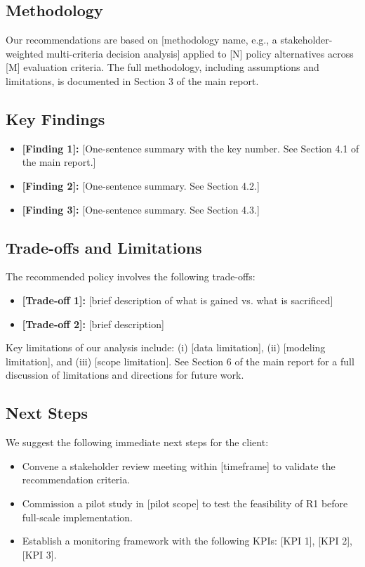 \documentclass[12pt, a4paper]{article}
\begin{document}
\subsection*{Methodology}
Our recommendations are based on [methodology name, e.g., a
stakeholder-weighted multi-criteria decision analysis] applied to
[N] policy alternatives across [M] evaluation criteria. The full
methodology, including assumptions and limitations, is documented
in Section 3 of the main report.

\subsection*{Key Findings}
\begin{itemize}[leftmargin=2em]
    \item \textbf{[Finding 1]:} [One-sentence summary with the key
    number. See Section 4.1 of the main report.]
    \item \textbf{[Finding 2]:} [One-sentence summary. See Section 4.2.]
    \item \textbf{[Finding 3]:} [One-sentence summary. See Section 4.3.]
\end{itemize}

\subsection*{Trade-offs and Limitations}
The recommended policy involves the following trade-offs:
\begin{itemize}[leftmargin=2em]
    \item \textbf{[Trade-off 1]:} [brief description of what is
    gained vs. what is sacrificed]
    \item \textbf{[Trade-off 2]:} [brief description]
\end{itemize}

Key limitations of our analysis include: (i) [data limitation],
(ii) [modeling limitation], and (iii) [scope limitation]. See
Section 6 of the main report for a full discussion of limitations
and directions for future work.

\subsection*{Next Steps}
We suggest the following immediate next steps for the client:
\begin{itemize}[leftmargin=2em]
    \item Convene a stakeholder review meeting within [timeframe]
    to validate the recommendation criteria.
    \item Commission a pilot study in [pilot scope] to test the
    feasibility of R1 before full-scale implementation.
    \item Establish a monitoring framework with the following KPIs:
    [KPI 1], [KPI 2], [KPI 3].
\end{itemize}
\end{document}
